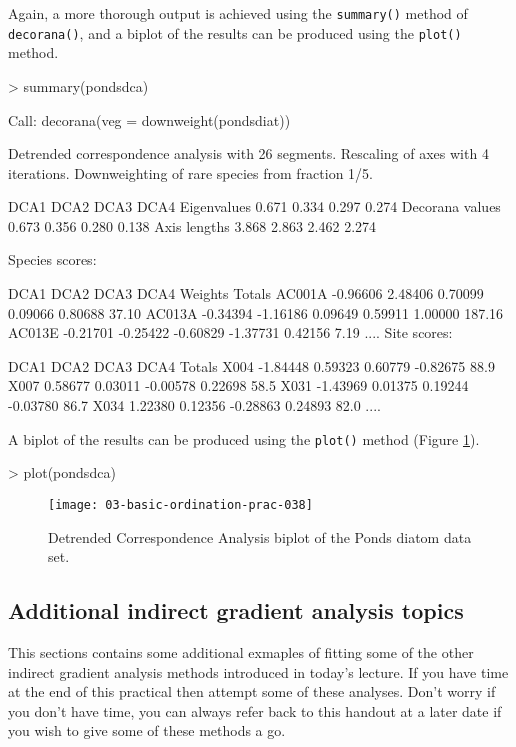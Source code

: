 \documentclass[a4paper,10pt]{article}
\begin{document}
{Again, a more thorough output is achieved using the \texttt{summary()} method of \texttt{decorana()}, and a biplot of the results can be produced using the \texttt{plot()} method.
\begin{Schunk}
\begin{Sinput}
> summary(pondsdca)
\end{Sinput}
\end{Schunk}
\begin{Schunk}
\begin{Soutput}
Call:
decorana(veg = downweight(pondsdiat)) 

Detrended correspondence analysis with 26 segments.
Rescaling of axes with 4 iterations.
Downweighting of rare species from fraction 1/5.

                 DCA1  DCA2  DCA3  DCA4
Eigenvalues     0.671 0.334 0.297 0.274
Decorana values 0.673 0.356 0.280 0.138
Axis lengths    3.868 2.863 2.462 2.274

Species scores:

           DCA1     DCA2     DCA3     DCA4  Weights Totals
AC001A -0.96606  2.48406  0.70099  0.09066  0.80688  37.10
AC013A -0.34394 -1.16186  0.09649  0.59911  1.00000 187.16
AC013E -0.21701 -0.25422 -0.60829 -1.37731  0.42156   7.19
....
Site scores:

         DCA1     DCA2     DCA3     DCA4 Totals
X004 -1.84448  0.59323  0.60779 -0.82675   88.9
X007  0.58677  0.03011 -0.00578  0.22698   58.5
X031 -1.43969  0.01375  0.19244 -0.03780   86.7
X034  1.22380  0.12356 -0.28863  0.24893   82.0
....
\end{Soutput}
\end{Schunk}
A biplot of the results can be produced using the \texttt{plot()} method (Figure \ref{plot_dca}).
\begin{Schunk}
\begin{Sinput}
> plot(pondsdca)
\end{Sinput}
\end{Schunk}
\begin{figure}[t]
\begin{center}
\texttt{[image: 03-basic-ordination-prac-038]}
\caption{\label{plot_dca}Detrended Correspondence Analysis biplot of the Ponds diatom data set.}
\end{center}
\end{figure}

\subsection{Additional indirect gradient analysis topics}
This sections contains some additional exmaples of fitting some of the other indirect gradient analysis methods introduced in today's lecture. If you have time at the end of this practical then attempt some of these analyses. Don't worry if you don't have time, you can always refer back to this handout at a later date if you wish to give some of these methods a go.

}
\end{document}
